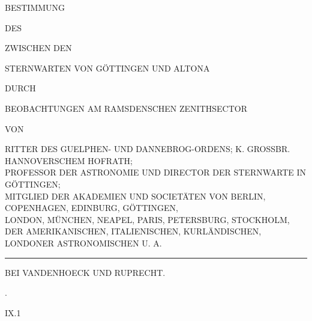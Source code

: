 \clearpage
\begin{center}
{\Large BESTIMMUNG}\par\vspace{8mm}
{\small DES}\par\vspace{8mm}
{\LARGE{}}\par\vspace{8mm}
{\small ZWISCHEN DEN}\par\vspace{7mm}
{\large STERNWARTEN VON GÖTTINGEN UND ALTONA}\par\vspace{7mm}
{\small DURCH}\par\vspace{7mm}
{\normalsize BEOBACHTUNGEN AM RAMSDENSCHEN ZENITHSECTOR}\par\vspace{7mm}
{\small VON}\par\vspace{7mm}
{\large{}}\par\smallskip
{\scriptsize
RITTER DES GUELPHEN- UND DANNEBROG-ORDENS; K. GROSSBR. HANNOVERSCHEM HOFRATH;\\
PROFESSOR DER ASTRONOMIE UND DIRECTOR DER STERNWARTE IN GÖTTINGEN;\\
MITGLIED DER AKADEMIEN UND SOCIETÄTEN VON BERLIN, COPENHAGEN, EDINBURG, GÖTTINGEN,\\
LONDON, MÜNCHEN, NEAPEL, PARIS, PETERSBURG, STOCKHOLM,\\
DER AMERIKANISCHEN, ITALIENISCHEN, KURLÄNDISCHEN, LONDONER ASTRONOMISCHEN U. A.
}\par\vspace{15mm}
\rule{.35\textwidth}{.4pt}\par\medskip
{\large{}}\par\medskip
BEI VANDENHOECK UND RUPRECHT.\par{}.
\end{center}
\vfill\noindent IX.\hfill 1\par

\clearpage
\null

